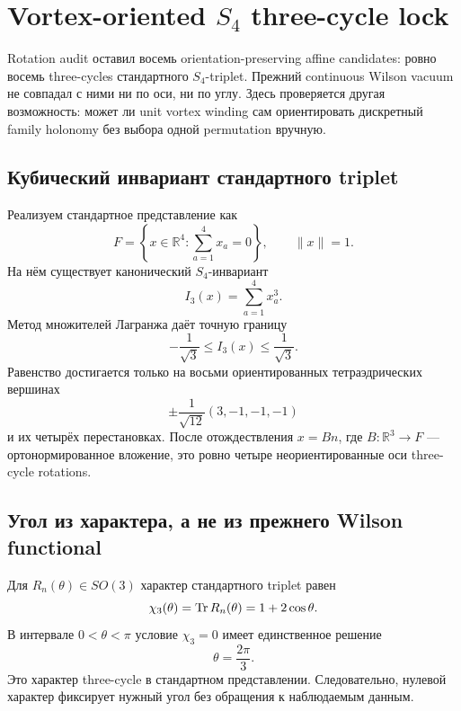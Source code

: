 \chapter{Vortex-oriented \texorpdfstring{$S_4$}{S4} three-cycle lock}

Rotation audit оставил восемь orientation-preserving affine candidates:
ровно восемь three-cycles стандартного \(S_4\)-triplet. Прежний continuous
Wilson vacuum не совпадал с ними ни по оси, ни по углу. Здесь проверяется
другая возможность: может ли unit vortex winding сам ориентировать
дискретный family holonomy без выбора одной permutation вручную.

\section{Кубический инвариант стандартного triplet}

Реализуем стандартное представление как
\begin{equation}
 F=\left\{x\in\mathbb R^4:\sum_{a=1}^4x_a=0\right\},
 \qquad \|x\|=1.
\end{equation}
На нём существует канонический \(S_4\)-инвариант
\begin{equation}
 I_3(x)=\sum_{a=1}^4x_a^3.
\end{equation}
Метод множителей Лагранжа даёт точную границу
\begin{equation}
 -\frac1{\sqrt3}\leq I_3(x)\leq\frac1{\sqrt3}.
\end{equation}
Равенство достигается только на восьми ориентированных тетраэдрических
вершинах
\begin{equation}
 \pm\frac1{\sqrt{12}}(3,-1,-1,-1)
\end{equation}
и их четырёх перестановках. После отождествления \(x=Bn\), где
\(B:\mathbb R^3\to F\) --- ортонормированное вложение, это ровно четыре
неориентированные оси three-cycle rotations.

\section{Угол из характера, а не из прежнего Wilson functional}

Для \(R_n(\theta)\in SO(3)\) характер стандартного triplet равен
\begin{equation}
 \chi_3(\theta)=\operatorname{Tr} R_n(\theta)=1+2\cos\theta.
\end{equation}
В интервале \(0<\theta<\pi\) условие \(\chi_3=0\) имеет единственное
решение
\begin{equation}
 \theta=\frac{2\pi}{3}.
\end{equation}
Это характер three-cycle в стандартном представлении. Следовательно,
нулевой характер фиксирует нужный угол без обращения к наблюдаемым данным.

